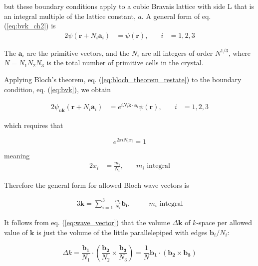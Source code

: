 	but these boundary conditions apply to a cubic Bravais lattice with side L that is an integral multiple of the lattice constant, $a$. A general form of eq. (\ref{eq:bvk_ch2}) is 
	\begin{alignat}{2}\label{eq:bvk}
		\psi(\mathbf{r} + N_i \mathbf{a}_i)
		&= \psi(\mathbf{r}),
		&\quad
		i &= 1,2,3
	\end{alignat}

	The $\mathbf{a}_i$ are the primitive vectors, and the $N_i$ are all integers of order $N^{1/3}$, where $N=N_1N_2N_3$ is the total number of primitive cells in the crystal.

	Applying Bloch's theorem, eq. (\ref{eq:bloch_theorem_restate}) to the boundary condition, eq. (\ref{eq:bvk}),  we obtain

	\begin{alignat}{2}\label{eq:bloch_applied}
		\psi_{n\mathbf{k}}
		(\mathbf{r} + N_i \mathbf{a}_i)
		&= 
		e^{i N_i \mathbf{k} \cdot \mathbf{a}_i}
		\psi(\mathbf{r}),
		&\quad
		i &= 1,2,3
	\end{alignat}

	which requires that

	\begin{equation} \label{eq:requirement}
		e^{2 \pi i N_i x_i} = 1
	\end{equation}

	meaning
	\begin{alignat}{2} \label{eq:xi}
		x_i &= \frac{m_i}{N_i},
		& \quad
		m_i\text{ integral}
	\end{alignat}


	Therefore the general form for allowed Bloch wave vectors is

	\begin{alignat}{3} \label{eq:wave_vector}
		\mathbf{k} =
		\sum_{i=1}^{3} \frac{m_i}{N_i}
		\mathbf{b_i}
		,
		&\quad 
		&m_i\text{ integral}
	\end{alignat}

	It follows from eq. (\ref{eq:wave_vector}) that the volume $\Delta\mathbf{k}$ of $k$-space per allowed value of $\mathbf{k}$ is just the volume of the little parallelepiped with edges $\mathbf{b}_i/N_i$:

	\begin{equation} \label{eq:deltak}
		\Delta{k}
		= 
		\frac{\mathbf{b_1}}{N_1}
		\cdot
		\left(
		\frac{\mathbf{b_2}}{N_2}
		\times
		\frac{\mathbf{b_3}}{N_3}
		\right)
		=
		\frac{1}{N}
		\mathbf{b_1}
		\cdot
		\left(
		\mathbf{b_2}
		\times
		\mathbf{b_3}
		\right)
	\end{equation}

